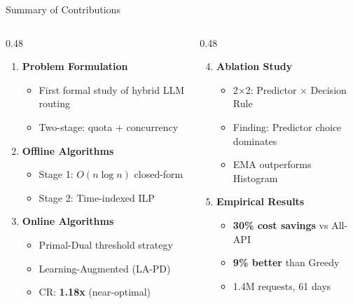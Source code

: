 \documentclass[aspectratio=169,10pt]{beamer}
\begin{document}
\begin{frame}{Summary of Contributions}
\begin{columns}[T]
\begin{column}{0.48\textwidth}
\begin{enumerate}
    \item \textbf{Problem Formulation}
    \begin{itemize}
        \item First formal study of hybrid LLM routing
        \item Two-stage: quota + concurrency
    \end{itemize}

    \vspace{0.2cm}
    \item \textbf{Offline Algorithms}
    \begin{itemize}
        \item Stage 1: $O(n \log n)$ closed-form
        \item Stage 2: Time-indexed ILP
    \end{itemize}

    \vspace{0.2cm}
    \item \textbf{Online Algorithms}
    \begin{itemize}
        \item Primal-Dual threshold strategy
        \item Learning-Augmented (LA-PD)
        \item CR: \textbf{1.18x} (near-optimal)
    \end{itemize}
\end{enumerate}
\end{column}

\begin{column}{0.48\textwidth}
\begin{enumerate}
    \setcounter{enumi}{3}
    \item \textbf{Ablation Study}
    \begin{itemize}
        \item 2$\times$2: Predictor $\times$ Decision Rule
        \item Finding: Predictor choice dominates
        \item EMA outperforms Histogram
    \end{itemize}

    \vspace{0.2cm}
    \item \textbf{Empirical Results}
    \begin{itemize}
        \item \textbf{30\% cost savings} vs All-API
        \item \textbf{9\% better} than Greedy
        \item 1.4M requests, 61 days
    \end{itemize}
\end{enumerate}


\end{column}
\end{columns}
\end{frame}
\end{document}
